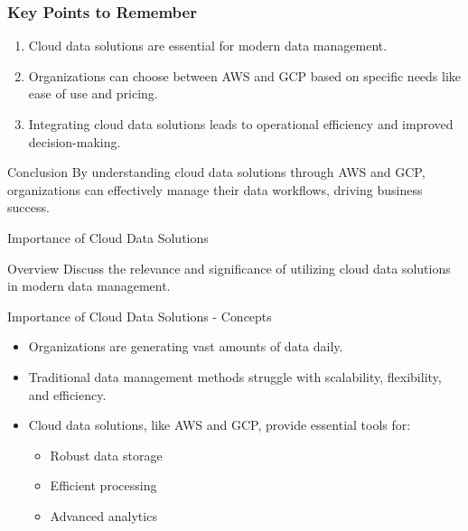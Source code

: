 \documentclass[aspectratio=169]{beamer}
\begin{document}
\begin{frame}[fragile]
    \frametitle{Key Points to Remember}
    \begin{enumerate}
        \item Cloud data solutions are essential for modern data management.
        \item Organizations can choose between AWS and GCP based on specific needs like ease of use and pricing.
        \item Integrating cloud data solutions leads to operational efficiency and improved decision-making.
    \end{enumerate}
    \begin{block}{Conclusion}
        By understanding cloud data solutions through AWS and GCP, organizations can effectively manage their data workflows, driving business success.
    \end{block}
\end{frame}

\begin{frame}[fragile]{Importance of Cloud Data Solutions}
    \begin{block}{Overview}
        Discuss the relevance and significance of utilizing cloud data solutions in modern data management.
    \end{block}
\end{frame}

\begin{frame}[fragile]{Importance of Cloud Data Solutions - Concepts}
    \begin{itemize}
        \item Organizations are generating vast amounts of data daily.
        \item Traditional data management methods struggle with scalability, flexibility, and efficiency.
        \item Cloud data solutions, like AWS and GCP, provide essential tools for:
        \begin{itemize}
            \item Robust data storage
            \item Efficient processing
            \item Advanced analytics
        \end{itemize}
    \end{itemize}
\end{frame}
\end{document}
